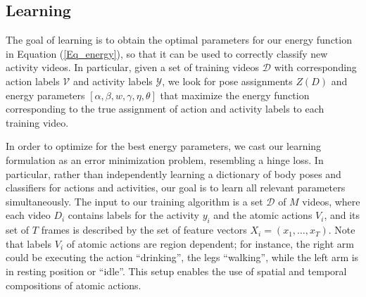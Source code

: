 \subsection{Learning} \label{subsec:modelformulation}
The goal of learning is to obtain the optimal parameters for our energy function
in Equation (\ref{Eq_energy}), so that it can be used to correctly classify new
activity videos.
In particular, given a set of training videos
$\mathcal{D}$ with
corresponding action labels $\mathcal{V}$ and activity labels $\mathcal{Y}$,
we look for pose assignments $Z(D)$ and energy parameters $[\alpha, \beta, w, 
\gamma, \eta, \theta]$ that maximize the energy function corresponding to the 
true assignment of action and activity labels to each training video. 



In order to optimize for the best energy parameters,
we cast our learning formulation as an error minimization problem, resembling a hinge loss. In particular, rather
than independently learning a dictionary of body poses and
classifiers for actions and activities, our goal is to learn all relevant
parameters simultaneously. The input to
our training algorithm is a set $\mathcal{D}$ of $M$ videos, where each
video $D_i$ contains labels for the activity $y_i$ and the atomic actions $V_i$,
and its set of $T$ frames is described by the set of feature
vectors $X_i=(x_1, \dots, x_T)$.
Note that labels $V_i$ of atomic actions are region dependent; for instance, the right
arm could be executing the action ``drinking'', the legs ``walking'', while the
left arm is in resting position or ``idle''. This setup enables the use of spatial and temporal 
compositions of atomic actions.

